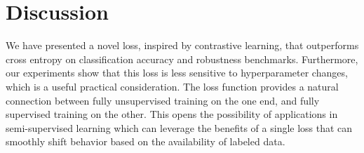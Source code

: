 \section{Discussion}
We have presented a novel loss, inspired by contrastive learning, that outperforms cross entropy on classification accuracy and robustness benchmarks. Furthermore, our experiments show that this loss is less sensitive to hyperparameter changes, which is a useful practical consideration. The loss function provides a natural connection between fully unsupervised training on the one end, and fully supervised training on the other. This opens the possibility of applications in semi-supervised learning which can leverage the benefits of a single loss that can smoothly shift behavior based on the availability of labeled data.